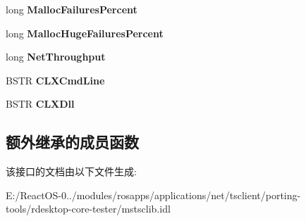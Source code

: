 \begin{DoxyCompactItemize}
long {\bfseries Malloc\+Failures\+Percent}
\item 
\mbox{\label{interface_m_s_t_s_c_lib_1_1_i_ms_tsc_debug_a7f774b3273e2bc6d0dc1e86dadedf6bc}} 
long {\bfseries Malloc\+Huge\+Failures\+Percent}
\item 
\mbox{\label{interface_m_s_t_s_c_lib_1_1_i_ms_tsc_debug_a47cb649287f70600efcc48f336163c73}} 
long {\bfseries Net\+Throughput}
\item 
\mbox{\label{interface_m_s_t_s_c_lib_1_1_i_ms_tsc_debug_a3444403747be994b6139d40f21af26f6}} 
B\+S\+TR {\bfseries C\+L\+X\+Cmd\+Line}
\item 
\mbox{\label{interface_m_s_t_s_c_lib_1_1_i_ms_tsc_debug_a79204badfd819eac34ae90dbe62d7a13}} 
B\+S\+TR {\bfseries C\+L\+X\+Dll}
\end{DoxyCompactItemize}
\subsection*{额外继承的成员函数}


该接口的文档由以下文件生成\+:\begin{DoxyCompactItemize}
\item 
E\+:/\+React\+O\+S-\/0../modules/rosapps/applications/net/tsclient/porting-\/tools/rdesktop-\/core-\/tester/mstsclib.\+idl\end{DoxyCompactItemize}
